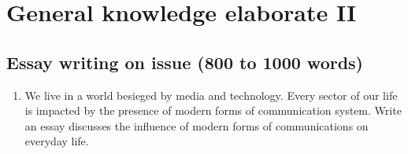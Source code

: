\documentclass[
  openany]{book}
\providecommand{\tightlist}{%
  \setlength{\itemsep}{0pt}\setlength{\parskip}{0pt}}
\begin{document}
\hypertarget{general-knowledge-elaborate-ii}{%
\chapter{General knowledge elaborate II}\label{general-knowledge-elaborate-ii}}

\hypertarget{essay-writing-on-issue-800-to-1000-words}{%
\section{Essay writing on issue (800 to 1000 words)}\label{essay-writing-on-issue-800-to-1000-words}}

\begin{enumerate}
\def\labelenumi{\arabic{enumi}.}
\tightlist
\item
  We live in a world besieged by media and technology. Every sector of our life is impacted by the presence of modern forms of communication system. Write an essay discusses the influence of modern forms of communications on everyday life.
\end{enumerate}
\end{document}
